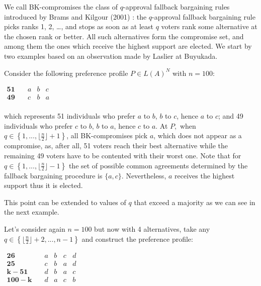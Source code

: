 \documentclass[version=3.21, pagesize, notitlepage, twoside=off, bibliography=totoc, DIV=calc, fontsize=12pt, a4paper]{scrartcl}
\begin{document}
We call BK-compromises the class of $q$-approval fallback bargaining rules introduced by Brams and Kilgour (2001) \cite{Brams2001}: the $q$-approval fallback bargaining rule picks ranks 1, 2, …, and stops as soon as at least $q$ voters rank some alternative at the chosen rank or better. All such alternatives form the compromise set, and among them the ones which receive the highest support are elected.
We start by two examples based on an observation made by Laslier at Buyukada. 
\begin{example}
	Consider the following preference profile $P\in L(A)^{N}$ with $n=100$:
	\begin{center}
		$
		\begin{array}{cccc}
		\mathbf{51} \quad &a&b&c\\
		\mathbf{49} \quad &c&b&a\\
		\end{array}
		$
	\end{center}
	which represents 51 individuals who prefer $a$ to $b$, $b$ to $c$, hence $a$ to $c$; and 49 individuals who prefer $c$ to $b$, $b$ to $a$, hence $c$ to $a $. At $P,$ when $q\in \left\{ 1,..., \lfloor \frac{n}{2}\rfloor +1\right\} $, all BK-compromises pick $a$, which does not appear as a compromise, as, after all, 51 voters reach their best alternative while the remaining 49 voters have to be contented with their worst one. Note that for $q\in \left\{ 1,..., \lfloor \frac{n}{2}\rfloor -1 \right\} $ the set of possible common agreements determined by the fallback bargaining procedure is $\{a,c\}$. Nevertheless, $a$ receives the highest support thus it is elected.
\end{example}

This point can be extended to values of $q$ that exceed a majority as we can see in the next example.

\begin{example}
	Let's consider again $n=100$ but now with 4 alternatives, take any $q\in \left\{ \lfloor \frac{n}{2}\rfloor +2,..., n-1\right\} $ and construct the preference profile:
	\begin{center}
		$
		\begin{array}{ccccc}
		\mathbf{26} \quad &a&b&c&d\\
		\mathbf{25} \quad &c&b&a&d\\
		\mathbf{k-51} \quad &d&b&a&c\\
		\mathbf{100-k} \quad &d&a&c&b\\
		\end{array}
		$
	\end{center}
\end{example}
\end{document}

